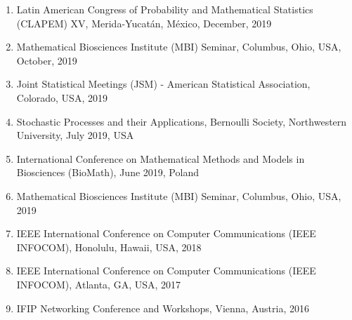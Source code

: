 \documentclass[11pt,a4paper,sans]{moderncv}        %
\begin{document}
\begin{enumerate}
	\item {Latin American Congress of Probability and Mathematical Statistics (CLAPEM) XV, Merida-Yucatán, México, December, 2019}
	\item {Mathematical Biosciences Institute (MBI) Seminar, Columbus, Ohio, USA, October, 2019}
	\item{Joint Statistical Meetings (JSM) - American Statistical Association, Colorado, USA, 2019} 
	\item{Stochastic Processes and their Applications, Bernoulli Society, Northwestern University, July 2019, USA}
	\item{International Conference on Mathematical Methods and Models in Biosciences (BioMath), June 2019, Poland}
	\item{Mathematical Biosciences Institute (MBI) Seminar, Columbus, Ohio, USA, 2019}
	\item{IEEE International Conference on Computer Communications (IEEE INFOCOM), Honolulu, Hawaii, USA, 2018}
	\item{IEEE International Conference on Computer Communications (IEEE INFOCOM), Atlanta, GA, USA, 2017}
	\item{IFIP Networking Conference  and Workshops, Vienna, Austria, 2016}
\end{enumerate}



\end{document}
